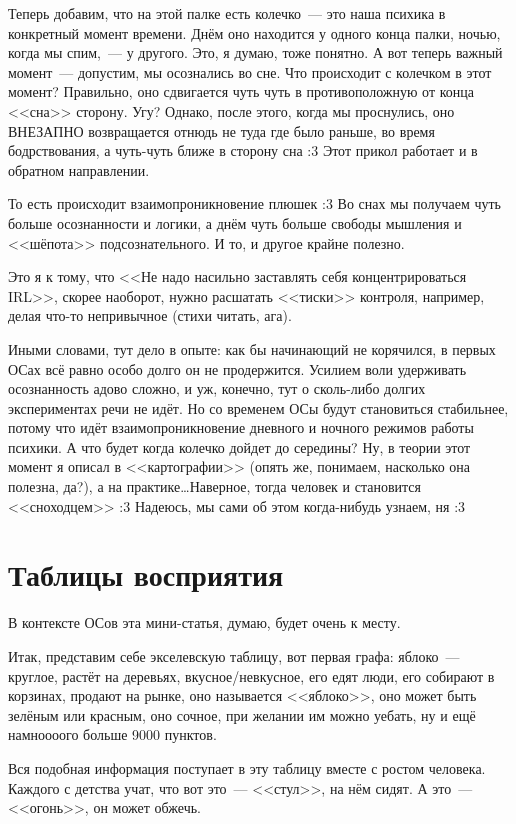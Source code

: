 \documentclass[a5paper,12pt,twoside]{memoir}
\begin{document}
Теперь добавим, что на этой палке есть колечко~--- это наша психика в конкретный момент времени. Днём оно находится у одного конца палки, ночью, когда мы спим,~--- у другого. Это, я думаю, тоже понятно. А вот теперь важный момент~--- допустим, мы осознались во сне. Что происходит с колечком в этот момент? Правильно, оно сдвигается чуть чуть в противоположную от конца <<сна>> сторону. Угу? Однако, после этого, когда мы проснулись, оно ВНЕЗАПНО возвращается отнюдь не туда где было раньше, во время бодрствования, а чуть-чуть ближе в сторону сна :3 Этот прикол работает и в обратном направлении.
 
То есть происходит взаимопроникновение плюшек :3 Во снах мы получаем чуть больше осознанности и логики, а днём чуть больше свободы мышления и <<шёпота>> подсознательного. И то, и другое крайне полезно.
 
Это я к тому, что <<Не надо насильно заставлять себя концентрироваться IRL>>, скорее наоборот, нужно расшатать <<тиски>> контроля, например, делая что-то непривычное (стихи читать, ага).
 
Иными словами, тут дело в опыте: как бы начинающий не корячился, в первых ОСах всё равно особо долго он не продержится. Усилием воли удерживать осознанность адово сложно, и уж, конечно, тут о сколь-либо долгих экспериментах речи не идёт. Но со временем ОСы будут становиться стабильнее, потому что идёт взаимопроникновение дневного и ночного режимов работы психики. А что будет когда колечко дойдет до середины? Ну, в теории этот момент я описал в <<картографии>> (опять же, понимаем, насколько она полезна, да?), а на практике\ldots Наверное, тогда человек и становится <<сноходцем>> :3 Надеюсь, мы сами об этом когда-нибудь узнаем, ня :3 



\section{Таблицы восприятия}
В контексте ОСов эта мини-статья, думаю, будет очень к месту. 

Итак, представим себе экселевскую таблицу, вот первая графа: яблоко~--- круглое, растёт на деревьях, вкусное/невкусное, его едят люди, его собирают в корзинах, продают на рынке, оно называется <<яблоко>>, оно может быть зелёным или красным, оно сочное, при желании им можно уебать, ну и ещё намноооого больше 9000 пунктов. 

Вся подобная информация поступает в эту таблицу вместе с ростом человека. Каждого с детства учат, что вот это~--- <<стул>>, на нём сидят. А это~--- <<огонь>>, он может обжечь. 
\end{document}

